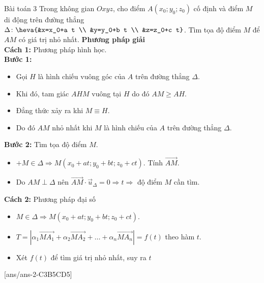 \begin{dang}{Bài toán 3}
Trong không gian $Oxyz$, cho điểm $A\left(x_0 ; y_0 ; z_0\right)$ cố định và điểm $M$ di động trên đường thẳng $\Delta\colon\heva{&x=x_0+a t \\ &y=y_0+b t \\ &z=z_0+c t}$. Tìm tọa độ điểm $M$ để $AM$ có giá trị nhỏ nhất.
\textbf{Phương pháp giải}
\\
\textbf{Cách 1:} Phương pháp hình học.
\\
\textbf{Bước 1:}
\begin{itemize}
	\item Gọi $H$ là hình chiếu vuông góc của $A$ trên đường thẳng $\Delta$.
	\item Khi đó, tam giác $AH M$ vuông tại $H$ do đó $AM \geq AH$.
	\item Đẳng thức xảy ra khi $M \equiv H$.
	\item Do đó $AM$ nhỏ nhất khi $M$ là hình chiếu của $A$ trên đường thẳng $\Delta$.
\end{itemize}
\textbf{Bước 2:} Tìm tọa độ điểm $M$.
\begin{itemize}
	\item $+M \in \Delta \Rightarrow M\left(x_0+a t ; y_0+b t ; z_0+c t\right)$. Tính $\vec{AM}$.
	\item Do $AM \perp \Delta$ nên $\vec{AM} \cdot \vec{u}_{\Delta}=0 \Rightarrow t \Rightarrow$ độ điểm $M$ cần tìm.
\end{itemize}

\textbf{Cách 2:} Phương pháp đại số
\begin{itemize}
	\item $M \in \Delta \Rightarrow M\left(x_0+a t ; y_0+b t ; z_0+c t\right)$.
	\item $T=\left|\alpha_1 \vec{MA_1}+\alpha_2 \vec{MA_2}+\ldots+\alpha_n \vec{MA_n}\right|=f(t)$ theo hàm $t$.
	\item Xét $f(t)$ để tìm giá trị nhỏ nhất, suy ra $t$
\end{itemize}
\end{dang}
[ans/ans-2-C3B5CD5]
\TN
